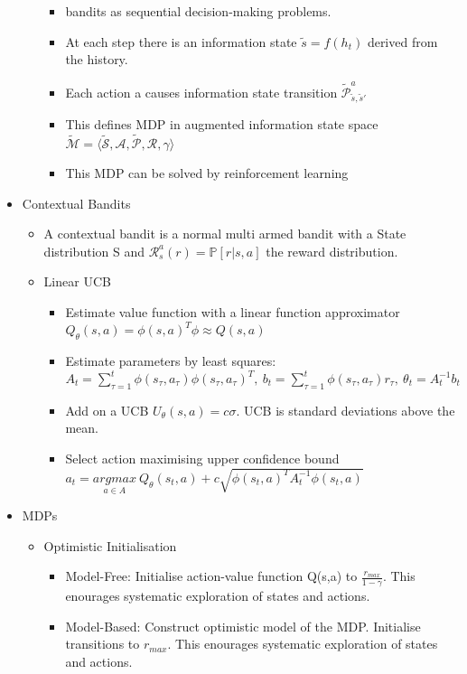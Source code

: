 \begin{itemize}[noitemsep,nolistsep]
\begin{itemize}
\begin{itemize}[noitemsep,nolistsep]
			\item bandits as sequential decision-making problems.
			\item At each step there is an information state $\tilde{s} = f(h_t)$ derived from the history.
			\item Each action a causes information state transition $\tilde{\mathcal{P}}_{\tilde{s},\tilde{s}'}^a$
			\item This defines MDP in augmented information state space $\tilde{\mathcal{M}} = \langle \mathcal{\tilde{S},A,\tilde{P},R},\gamma\rangle $
			\item This MDP can be solved by reinforcement learning
		\end{itemize}
	\end{itemize}
	\item Contextual Bandits
	\begin{itemize}[noitemsep,nolistsep]
		\item A contextual bandit is a normal multi armed bandit with a State distribution S and $\mathcal{R}_s^a(r) = \mathbb{P}[r|s,a]$ the reward distribution.
		\item Linear UCB
		\begin{itemize}[noitemsep,nolistsep]
			\item Estimate value function with a linear function approximator $Q_\theta(s,a) = \phi(s,a)^T\phi \approx Q(s,a)$
			\item Estimate parameters by least squares: $A_t = \sum_{\tau=1}^t \phi(s_\tau, a_\tau)\phi(s_\tau,a_\tau)^T,\ b_t = \sum_{\tau=1}^t \phi(s_\tau,a_\tau)r_\tau,\ \theta_t = A_t^{-1}b_t$
			\item Add on a UCB $U_\theta (s,a) = c \sigma$. UCB is standard deviations above the mean.
			\item Select action maximising upper confidence bound $a_t = \underset{a \in A}{argmax}\ Q_\theta(s_t,a) + c \sqrt{\phi(s_t,a)^TA_t^{-1}\phi(s_t,a)}$
		\end{itemize}
	\end{itemize}
	\item MDPs
	\begin{itemize}[noitemsep,nolistsep]
		\item Optimistic Initialisation
		\begin{itemize}[noitemsep,nolistsep]
			\item Model-Free: Initialise action-value function Q(s,a) to $\frac{r_{max}}{1 - \gamma}$. This enourages systematic exploration of states and actions.
			\item Model-Based: Construct optimistic model of the MDP. Initialise transitions to $r_{max}$. This enourages systematic exploration of states and actions.

\end{itemize}
\end{itemize}
\end{itemize}
